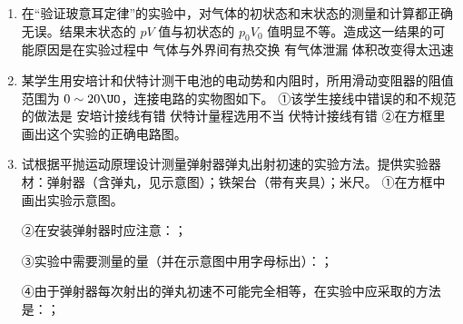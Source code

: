 \documentclass[\gkver]{gaokaozhenti}
\begin{document}
\begin{enumerate}
\item
在“验证玻意耳定律”的实验中，对气体的初状态和末状态的测量和计算都正确无误。结果末状态的 $pV$ 值与初状态的 $p_{0}V_{0}$ 值明显不等。造成这一结果的可能原因是在实验过程中
{气体与外界间有热交换}
{有气体泄漏}
{体积改变得太迅速}

\item
某学生用安培计和伏特计测干电池的电动势和内阻时，所用滑动变阻器的阻值范围为 $0\sim20\UO$，连接电路的实物图如下。
\onepicture[align=right, w=8.00cm]{}
①该学生接线中错误的和不规范的做法是
{安培计接线有错}
{伏特计量程选用不当}
{伏特计接线有错}
②在方框里画出这个实验的正确电路图。

\item
试根据平抛运动原理设计测量弹射器弹丸出射初速的实验方法。提供实验器材：弹射器（含弹丸，见示意图）；铁架台（带有夹具）；米尺。
\onepicture[align=right, w=4.00cm]{}
①在方框中画出实验示意图。

②在安装弹射器时应注意：；

③实验中需要测量的量（并在示意图中用字母标出）：；

④由于弹射器每次射出的弹丸初速不可能完全相等，在实验中应采取的方法是：；


\end{enumerate}
\end{document}
